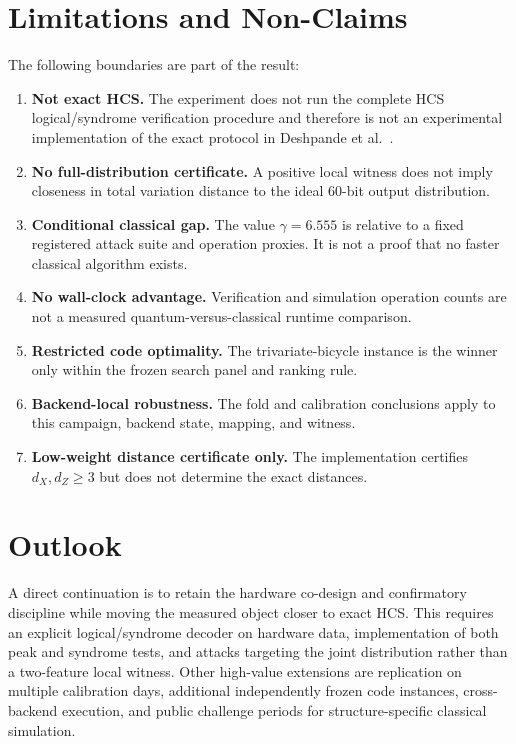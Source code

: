 \documentclass[11pt]{article}
\begin{document}
\section{Limitations and Non-Claims}
The following boundaries are part of the result:
\begin{enumerate}
  \item \textbf{Not exact HCS.} The experiment does not run the complete HCS logical/syndrome verification procedure and therefore is not an experimental implementation of the exact protocol in Deshpande et al.~\cite{deshpande2025hcs}.
  \item \textbf{No full-distribution certificate.} A positive local witness does not imply closeness in total variation distance to the ideal 60-bit output distribution.
  \item \textbf{Conditional classical gap.} The value $\gamma=6.555$ is relative to a fixed registered attack suite and operation proxies. It is not a proof that no faster classical algorithm exists.
  \item \textbf{No wall-clock advantage.} Verification and simulation operation counts are not a measured quantum-versus-classical runtime comparison.
  \item \textbf{Restricted code optimality.} The trivariate-bicycle instance is the winner only within the frozen search panel and ranking rule.
  \item \textbf{Backend-local robustness.} The fold and calibration conclusions apply to this campaign, backend state, mapping, and witness.
  \item \textbf{Low-weight distance certificate only.} The implementation certifies $d_X,d_Z\geq3$ but does not determine the exact distances.
\end{enumerate}

\section{Outlook}
A direct continuation is to retain the hardware co-design and confirmatory discipline while moving the measured object closer to exact HCS. This requires an explicit logical/syndrome decoder on hardware data, implementation of both peak and syndrome tests, and attacks targeting the joint distribution rather than a two-feature local witness. Other high-value extensions are replication on multiple calibration days, additional independently frozen code instances, cross-backend execution, and public challenge periods for structure-specific classical simulation.
\end{document}
